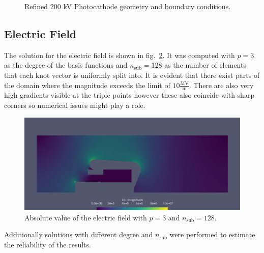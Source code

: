 %   

\begin{center}
\begin{figure}[H]
  
  \caption{Refined 200 kV Photocathode geometry and boundary conditions.}
  \label{fig:200kV_geometry_v3}
\end{figure}
\end{center}

\subsection{Electric Field}
The solution for the electric field is shown in fig.~\ref{fig:200kV_electric_field}.
It was computed with $p=3$ as the degree of the basis functions and $n_\mathrm{sub}=128$ as the number of elements that each knot vector is uniformly split into.
It is evident that there exist parts of the domain where the magnitude exceeds the limit of $10 \frac{\mathrm{MV}}{\mathrm{m}}$. There are also very high gradients visible at the triple points however these also coincide with sharp corners so numerical issues might play a role.

\begin{center}
\begin{figure}[H]
  \includegraphics[width=\textwidth]{figures/200kV/degree=3_nsub=128}
  \caption{Absolute value of the electric field with $p=3$ and $n_\mathrm{sub}=128$.}
  \label{fig:200kV_electric_field}
\end{figure}
\end{center}

Additionally solutions with different degree and $n_\mathrm{sub}$ were performed to estimate the reliability of the results.

